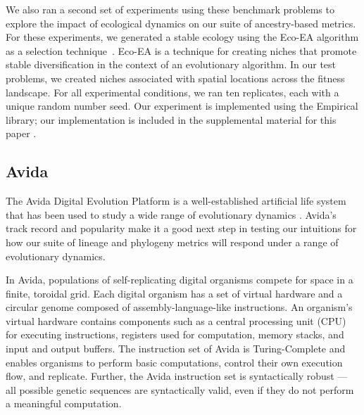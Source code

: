 \documentclass[letterpaper]{article}
\begin{document}
We also ran a second set of experiments using these benchmark problems to explore the impact of ecological dynamics on our suite of ancestry-based metrics. For these experiments, we generated a stable ecology using the Eco-EA algorithm as a selection technique~\citep{goings_ecology-based_2012}. Eco-EA is a technique for creating niches that promote stable diversification in the context of an evolutionary algorithm. In our test problems, we created niches associated with spatial locations across the fitness landscape. For all experimental conditions, we ran ten replicates, each with a unique random number seed. Our experiment is implemented using the Empirical library; our implementation is included in the supplemental material for this paper \citep{supplement}. 

\subsection{Avida}



The Avida Digital Evolution Platform \citep{ofria_avida:_2004} is a well-established artificial life system that has been used to study a wide range of evolutionary dynamics \citep{lenski_evolutionary_2003, goldsby_task-switching_2012,zaman_coevolution_2014, dolson_effects_2016}.
Avida's track record and popularity make it a good next step in testing our intuitions for how our suite of lineage and phylogeny metrics will respond under a range of evolutionary dynamics.

In Avida, populations of self-replicating digital organisms compete for space in a finite, toroidal grid. 
Each digital organism has a set of virtual hardware and a circular genome composed of assembly-language-like instructions.
An organism's virtual hardware contains components such as a central processing unit (CPU) for executing instructions, registers used for computation, memory stacks, and input and output buffers. 
The instruction set of Avida is Turing-Complete and enables organisms to perform basic computations, control their own execution flow, and replicate. 
Further, the Avida instruction set is syntactically robust --- all possible genetic sequences are syntactically valid, even if they do not perform a meaningful computation.
\end{document}
